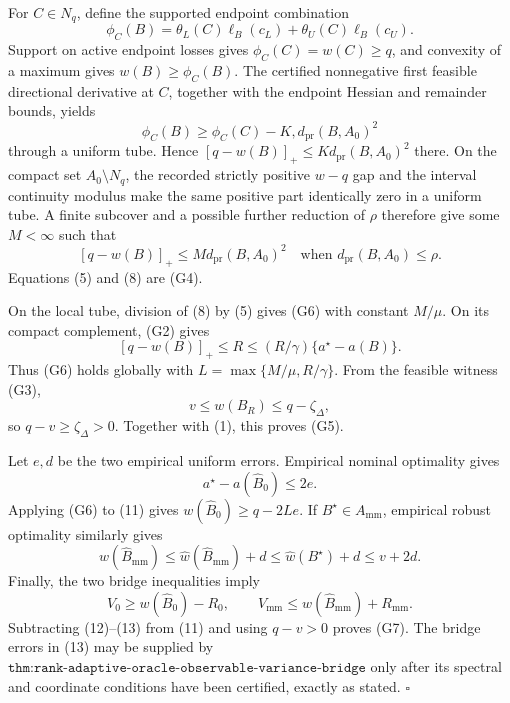 For \(C\in N_q\), define the supported endpoint combination
\[
\phi_C(B)=\theta_L(C)\ell_B(c_L)+\theta_U(C)\ell_B(c_U).
\tag{6}
\]
Support on active endpoint losses gives \(\phi_C(C)=w(C)\ge q\), and convexity of a maximum gives \(w(B)\ge\phi_C(B)\).  The certified nonnegative first feasible directional derivative at \(C\), together with the endpoint Hessian and remainder bounds, yields
\[
\phi_C(B)\ge\phi_C(C)-K,d_{\mathrm{pr}}(B,A_0)^2
\tag{7}
\]
through a uniform tube.  Hence \([q-w(B)]_+\le Kd_{\mathrm{pr}}(B,A_0)^2\) there.  On the compact set \(A_0\setminus N_q\), the recorded strictly positive \(w-q\) gap and the interval continuity modulus make the same positive part identically zero in a uniform tube.  A finite subcover and a possible further reduction of \(\rho\) therefore give some \(M<\infty\) such that
\[
[q-w(B)]_+\le M d_{\mathrm{pr}}(B,A_0)^2
\quad\text{when }d_{\mathrm{pr}}(B,A_0)\le\rho.
\tag{8}
\]
Equations (5) and (8) are (G4).

On the local tube, division of (8) by (5) gives (G6) with constant \(M/\mu\).  On its compact complement, (G2) gives
\[
[q-w(B)]_+\le R\le(R/\gamma)\{a^\star-a(B)\}.
\tag{9}
\]
Thus (G6) holds globally with \(L=\max\{M/\mu,R/\gamma\}\).  From the feasible witness (G3),
\[
v\le w(B_R)\le q-\zeta_\Delta,
\tag{10}
\]
so \(q-v\ge\zeta_\Delta>0\).  Together with (1), this proves (G5).

Let \(e,d\) be the two empirical uniform errors.  Empirical nominal optimality gives
\[
a^\star-a(\widehat B_0)\le2e.
\tag{11}
\]
Applying (G6) to (11) gives \(w(\widehat B_0)\ge q-2Le\).  If \(B^\star\in A_{\mathrm{mm}}\), empirical robust optimality similarly gives
\[
w(\widehat B_{\mathrm{mm}})
\le\widehat w(\widehat B_{\mathrm{mm}})+d
\le\widehat w(B^\star)+d
\le v+2d.
\tag{12}
\]
Finally, the two bridge inequalities imply
\[
V_0\ge w(\widehat B_0)-R_0,
\qquad
V_{\mathrm{mm}}\le w(\widehat B_{\mathrm{mm}})+R_{\mathrm{mm}}.
\tag{13}
\]
Subtracting (12)--(13) from (11) and using \(q-v>0\) proves (G7).  The bridge errors in (13) may be supplied by \(\texttt{thm:rank-adaptive-oracle-observable-variance-bridge}\) only after its spectral and coordinate conditions have been certified, exactly as stated. \(\square\)